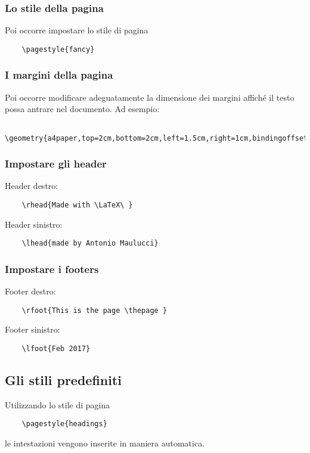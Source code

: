 \documentclass[a4paper, 12pt]{article}
\begin{document}
\subsubsection{Lo stile della pagina}
Poi occorre impostare lo stile di pagina
\begin{verbatim}
    \pagestyle{fancy}
\end{verbatim}

\subsubsection{I margini della pagina}
Poi occorre modificare adeguatamente la dimensione dei margini affiché il testo possa antrare nel documento. Ad esempio:
\begin{verbatim}
    \geometry{a4paper,top=2cm,bottom=2cm,left=1.5cm,right=1cm,bindingoffset=5mm}
\end{verbatim}

\subsubsection{Impostare gli header}

Header destro:
\begin{verbatim}
    \rhead{Made with \LaTeX\ }
\end{verbatim}

Header sinistro:
\begin{verbatim}
    \lhead{made by Antonio Maulucci}
\end{verbatim}

\subsubsection{Impostare i footers}

Footer destro:
\begin{verbatim}
    \rfoot{This is the page \thepage }
\end{verbatim}

Footer sinistro:
\begin{verbatim}
    \lfoot{Feb 2017}
\end{verbatim}






\subsection{Gli stili predefiniti}

Utilizzando lo stile di pagina 
\begin{verbatim}
    \pagestyle{headings}
\end{verbatim}
le intestazioni vengono inserite in maniera automatica.
\end{document}
